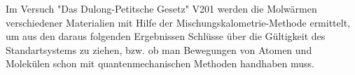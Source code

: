Im Versuch "Das Dulong-Petitsche Gesetz"  V201 werden die Molwärmen
verschiedener Materialien mit Hilfe der Mischungskalometrie-Methode ermittelt,
um aus den daraus folgenden Ergebnissen Schlüsse über die Gültigkeit des Standartsystems zu ziehen, bzw. ob man Bewegungen von Atomen und Molekülen schon mit quantenmechanischen Methoden handhaben muss.
